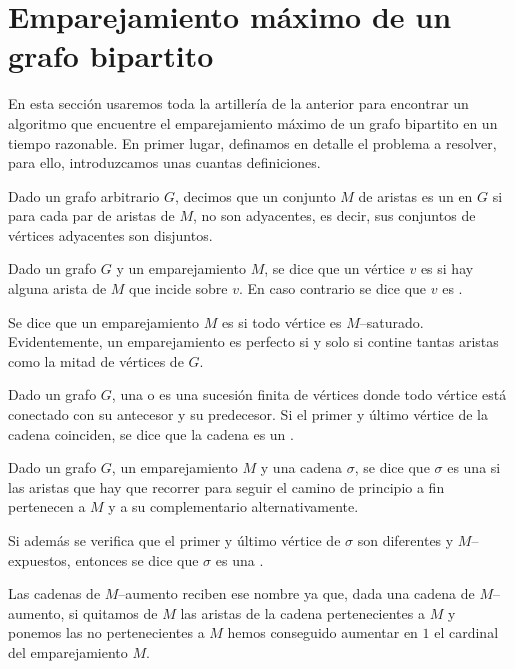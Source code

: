 \section{Emparejamiento máximo de un grafo bipartito}
En esta sección usaremos toda la artillería de la anterior para encontrar un algoritmo que encuentre el emparejamiento máximo de un grafo bipartito en un tiempo razonable. En primer lugar, definamos en detalle el problema a resolver, para ello, introduzcamos unas cuantas definiciones.
\begin{defi}[Emparejamiento]
	Dado un grafo arbitrario $G$, decimos que un conjunto $M$ de aristas es un  en $G$ si para cada par de aristas de $M$, no son adyacentes, es decir, sus conjuntos de vértices adyacentes son disjuntos.
\end{defi}
\begin{defi}
	Dado un grafo $G$ y un emparejamiento $M$, se dice que un vértice $v$ es  si hay alguna arista de $M$ que incide sobre $v$. En caso contrario se dice que $v$ es .
\end{defi}
\begin{defi}
	Se dice que un emparejamiento $M$ es  si todo vértice es $M$--saturado. Evidentemente, un emparejamiento es perfecto si y solo si contine tantas aristas como la mitad de vértices de $G$.
\end{defi}
\begin{defi}[Cadenas]
	Dado un grafo $G$, una  o  es una sucesión finita de vértices donde todo vértice está conectado con su antecesor y su predecesor. Si el primer y último vértice de la cadena coinciden, se dice que la cadena es un .
\end{defi}
\begin{defi}
	Dado un grafo $G$, un emparejamiento $M$ y una cadena $\sigma$, se dice que $\sigma$ es una  si las aristas que hay que recorrer para seguir el camino de principio a fin pertenecen a $M$ y a su complementario alternativamente.
	
	Si además se verifica que el primer y último vértice de $\sigma$ son diferentes y $M$--expuestos, entonces se dice que $\sigma$ es una .
\end{defi}
\begin{obs}
	\label{asig_obs_aumento}
	Las cadenas de $M$--aumento reciben ese nombre ya que, dada una cadena de $M$--aumento, si quitamos de $M$ las aristas de la cadena pertenecientes a $M$ y ponemos las no pertenecientes a $M$ hemos conseguido aumentar en $1$ el cardinal del emparejamiento $M$.
\end{obs}
